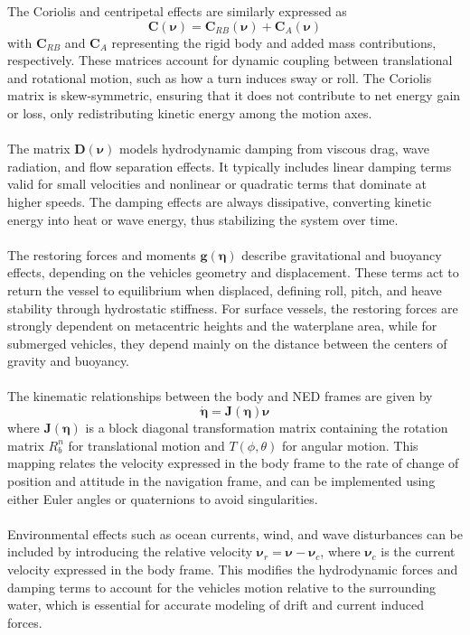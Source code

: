 The Coriolis and centripetal effects are similarly expressed as
$$
    \mathbf{C}(\boldsymbol{\nu}) = \mathbf{C}_{RB}(\boldsymbol{\nu}) + \mathbf{C}_A(\boldsymbol{\nu})
$$
with $\mathbf{C}_{RB}$ and $\mathbf{C}_A$ representing the rigid body and added mass contributions, respectively. These matrices account for dynamic coupling between translational and rotational motion, such as how a turn induces sway or roll. The Coriolis matrix is skew-symmetric, ensuring that it does not contribute to net energy gain or loss, only redistributing kinetic energy among the motion axes.  
\\ \\
The matrix $\mathbf{D}(\boldsymbol{\nu})$ models hydrodynamic damping from viscous drag, wave radiation, and flow separation effects. It typically includes linear damping terms valid for small velocities and nonlinear or quadratic terms that dominate at higher speeds. The damping effects are always dissipative, converting kinetic energy into heat or wave energy, thus stabilizing the system over time.  
\\ \\
The restoring forces and moments $\mathbf{g}(\boldsymbol{\eta})$ describe gravitational and buoyancy effects, depending on the vehicles geometry and displacement. These terms act to return the vessel to equilibrium when displaced, defining roll, pitch, and heave stability through hydrostatic stiffness. For surface vessels, the restoring forces are strongly dependent on metacentric heights and the waterplane area, while for submerged vehicles, they depend mainly on the distance between the centers of gravity and buoyancy.  
\\ \\
The kinematic relationships between the body and NED frames are given by
$$
    \dot{\boldsymbol{\eta}} = \mathbf{J}(\boldsymbol{\eta})\boldsymbol{\nu}
$$
where $\mathbf{J}(\boldsymbol{\eta})$ is a block diagonal transformation matrix containing the rotation matrix $R_b^n$ for translational motion and $T(\phi, \theta)$ for angular motion. This mapping relates the velocity expressed in the body frame to the rate of change of position and attitude in the navigation frame, and can be implemented using either Euler angles or quaternions to avoid singularities.  
\\ \\
Environmental effects such as ocean currents, wind, and wave disturbances can be included by introducing the relative velocity $\boldsymbol{\nu}_r = \boldsymbol{\nu} - \boldsymbol{\nu}_c$, where $\boldsymbol{\nu}_c$ is the current velocity expressed in the body frame. This modifies the hydrodynamic forces and damping terms to account for the vehicles motion relative to the surrounding water, which is essential for accurate modeling of drift and current induced forces.  
